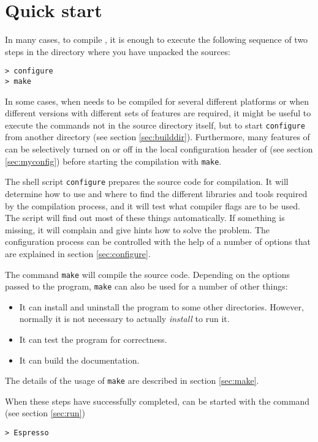 \section{Quick start}


In many cases, to compile \es{}, it is enough to execute the following
sequence of two steps in the directory where you have unpacked the
sources:
\begin{verbatim}
> configure
> make
\end{verbatim}

In some cases, \eg{} when \es{} needs to be compiled for several
different platforms or when different versions with different sets of
features are required, it might be useful to execute the commands not
in the source directory itself, but to start \texttt{configure} from
another directory (see section \vref{sec:builddir}). Furthermore, many
features of \es{} can be selectively turned on or off in the local
configuration header of \es{} (see section \vref{sec:myconfig}) before
starting the compilation with \texttt{make}.

The shell script \texttt{configure} prepares the source code for
compilation. It will determine how to use and where to find the
different libraries and tools required by the compilation process, and
it will test what compiler flags are to be used.  The script will find
out most of these things automatically.  If something is missing, it
will complain and give hints how to solve the problem.  The
configuration process can be controlled with the help of a number of
options that are explained in section \vref{sec:configure}.

The command \texttt{make} will compile the source code. Depending on
the options passed to the program, \texttt{make} can also be used for
a number of other things:
\begin{itemize}
\item It can install and uninstall the program to some other
  directories. However, normally it is not necessary to actually
  \textit{install} \es{} to run it.
\item It can test the \es{} program for correctness.
\item It can build the documentation.
\end{itemize}
The details of the usage of \texttt{make} are described in section
\vref{sec:make}.

When these steps have successfully completed, \es{} can be started
with the command (see section \vref{sec:run})
\begin{verbatim}
> Espresso
\end{verbatim}

